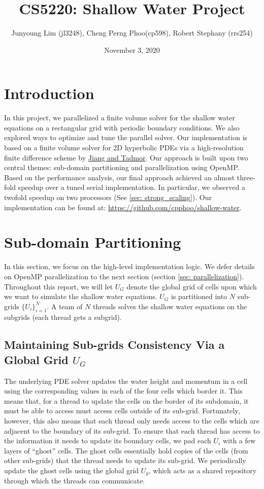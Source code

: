 \documentclass{article}
\title{CS5220: Shallow Water Project}
\author{Junyoung Lim (jl3248), Cheng Perng Phoo(cp598), Robert Stephany (rrs254)}
\date{November 3, 2020}
\begin{document}
\maketitle

\section{Introduction}

In this project, we parallelized a finite volume solver for the shallow water equations on a rectangular grid with periodic boundary conditions.
We also explored ways to optimize and tune the parallel solver.
Our implementation is based on a finite volume solver for 2D hyperbolic PDEs
via a high-resolution finite difference scheme by \href{http://www.cscamm.umd.edu/tadmor/pub/central-schemes/Jiang-Tadmor.SISSC-98.pdf}{Jiang and Tadmor}.
Our approach is built upon two central themes: sub-domain partitioning and parallelization using OpenMP.
Based on the performance analysis, our final approach achieved an almost three-fold speedup over a tuned serial implementation.
In particular, we observed a twofold speedup on two processors (See \ref{sec: strong_scaling}).
Our implementation can be found at: \url{https://github.com/cpphoo/shallow-water}.

\section{Sub-domain Partitioning}
\label{sec:subdomain_partitioning}
In this section, we focus on the high-level implementation logic.
We defer details on OpenMP parallelization to the next section (section \ref{sec: parallelization}).
Throughout this report, we will let $U_G$ denote the global grid of cells upon which we want to simulate the shallow water equations.
$U_G$ is partitioned into $N$ sub-grids $\{U_i\}_{i=1}^N$.
A team of $N$ threads solves the shallow water equations on the subgrids (each thread gets a subgrid).

\subsection{Maintaining Sub-grids Consistency Via a Global Grid $U_G$}

The underlying PDE solver updates the water height and momentum in a cell using the corresponding values in each of the four cells which border it.
This means that, for a thread to update the cells on the border of its subdomain,  it must be able to access must access cells outside of its sub-grid.
Fortunately, however, this also means that each thread only needs access to the cells which are adjacent to the boundary of its sub-grid.
To ensure that each thread has access to the information it needs to update its boundary cells, we pad each $U_i$ with a few layers of ``ghost'' cells.
The ghost cells essentially hold copies of the cells (from other sub-grids) that the thread needs to update its sub-grid.
We periodically update the ghost cells using the global grid $U_g$, which acts as a shared repository through which the threads can communicate.
\end{document}
